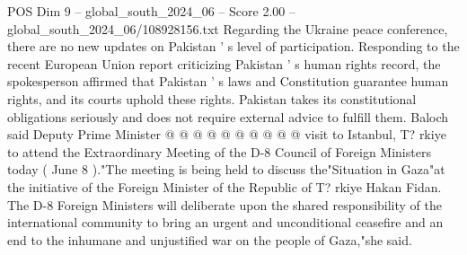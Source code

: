 \begin{textsample}{POS Dim 9 – global\_south\_2024\_06 – Score 2.00 – global\_south\_2024\_06/108928156.txt}
Regarding the Ukraine peace conference, there are no new updates on Pakistan ' s level of participation.
Responding to the recent European Union report criticizing Pakistan ' s human rights record, the spokesperson affirmed that Pakistan ' s laws and Constitution guarantee human rights, and its courts uphold these rights.
Pakistan takes its constitutional obligations seriously and does not require external advice to fulfill them.
Baloch said Deputy Prime Minister @ @ @ @ @ @ @ @ @ @ visit to Istanbul, T? rkiye to attend the Extraordinary Meeting of the D-8 Council of Foreign Ministers today ( June 8 )."The meeting is being held to discuss the"Situation in Gaza"at the initiative of the Foreign Minister of the Republic of T? rkiye Hakan Fidan.
The D-8 Foreign Ministers will deliberate upon the shared responsibility of the international community to bring an urgent and unconditional ceasefire and an end to the inhumane and unjustified war on the people of Gaza,"she said.

\end{textsample}
